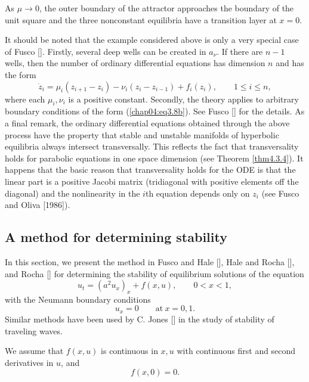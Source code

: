 \documentclass{surv-l}
\theoremstyle{plain}
\theoremstyle{definition}
\numberwithin{equation}{section}
\numberwithin{figure}{chapter}
\begin{document}
As $\mu\rightarrow 0$, the outer boundary of the attractor approaches the boundary of the unit square and the three nonconstant equilibria have a transition layer at $x=0$.

It should be noted that the example considered above is only a very special case of Fusco [\citeyear{1987f}]. Firstly, several deep wells can be created in $a_{\nu}$. If there are $n-1$ wells, then the number of ordinary differential equations has dimension $n$ and has the form
\begin{equation*}
\dot{z}_{i}=\mu_{i}(z_{i+1}-z_{i})-\nu_{i}(z_{i}-z_{i-1})+f_{i}(z_{i}), \qquad 1\leq i\leq n,
\end{equation*}
where each $\mu_{i},\nu_{i}$ is a positive constant. Secondly, the theory applies to arbitrary boundary conditions of the form (\ref{chap04:eq3.8b}). See Fusco [\citeyear{1987f}] for the details. As a final remark, the ordinary differential equations obtained through the above process have the property that stable and unstable manifolds of hyperbolic equilibria always intersect transversally. This reflects the fact that transversality holds for parabolic equations in one space dimension (see Theorem \ref{thm4.3.4}). It happens that the basic reason that transversality holds for the ODE is that the linear part is a positive Jacobi matrix (tridiagonal with positive elements off the diagonal) and the nonlinearity in the $i$th equation depends only on $z_{i}$ (see Fusco and Oliva [1986]).

\subsection{A method for determining stability}\label{subsec4.3.7} In this section, we present the method in Fusco and Hale [\citeyear{1985fh}], Hale and Rocha [\citeyear{1985hr}], and Rocha [\citeyear{1985r}] for determining the stability of equilibrium solutions of the equation 
\begin{equation}\label{chap04:eq3.34}
u_{t}=(a^{2}u_{x})_{x}+f(x, u), \qquad 0<x<1,
\end{equation}
with the Neumann boundary conditions
\begin{equation}\label{chap04:eq3.35}
u_{x}=0 \qquad \mathrm{at}\ x=0,1.
\end{equation}
Similar methods have been used by C. Jones [\citeyear{1984j}] in the study of stability of traveling waves.

We assume that $f(x, u)$ is continuous in $x, u$ with continuous first and second derivatives in $u$, and
\begin{equation}\label{chap04:eq3.36}
f(x, 0)=0.
\end{equation}
\end{document}
